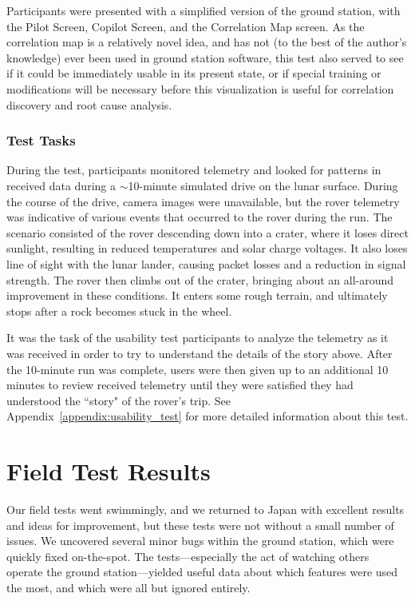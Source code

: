 Participants were presented with a simplified version of the ground station, with the Pilot Screen, Copilot Screen, and the Correlation Map screen. As the correlation map is a relatively novel idea, and has not (to the best of the author's knowledge) ever been used in ground station software, this test also served to see if it could be immediately usable in its present state, or if special training or modifications will be necessary before this visualization is useful for correlation discovery and root cause analysis.

\subsubsection{Test Tasks}

During the test, participants monitored telemetry and looked for patterns in received data during a $\sim$10-minute simulated drive on the lunar surface. During the course of the drive, camera images were unavailable, but the rover telemetry was indicative of various events that occurred to the rover during the run. The scenario consisted of the rover descending down into a crater, where it loses direct sunlight, resulting in reduced temperatures and solar charge voltages. It also loses line of sight with the lunar lander, causing packet losses and a reduction in signal strength. The rover then climbs out of the crater, bringing about an all-around improvement in these conditions. It enters some rough terrain, and ultimately stops after a rock becomes stuck in the wheel.

It was the task of the usability test participants to analyze the telemetry as it was received in order to try to understand the details of the story above. After the 10-minute run was complete, users were then given up to an additional 10 minutes to review received telemetry until they were satisfied they had understood the ``story" of the rover's trip. See Appendix~\ref{appendix:usability_test} for more detailed information about this test.

\section{Field Test Results}

Our field tests went swimmingly, and we returned to Japan with excellent results and ideas for improvement, but these tests were not without a small number of issues. We uncovered several minor bugs within the ground station, which were quickly fixed on-the-spot. The tests---especially the act of watching others operate the ground station---yielded useful data about which features were used the most, and which were all but ignored entirely.


